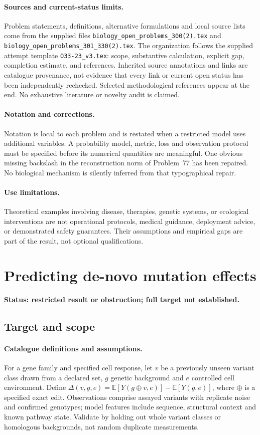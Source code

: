 \documentclass[11pt]{article}
\begin{document}
\paragraph{Sources and current-status limits.}
Problem statements, definitions, alternative formulations and local source lists
come from the supplied files
\texttt{biology\_open\_problems\_300(2).tex} and
\texttt{biology\_open\_problems\_301\_330(2).tex}.
The organization follows the supplied attempt template
\texttt{O33-23\_v3.tex}: scope, substantive calculation, explicit gap,
completion estimate, and references. Inherited source annotations and links are
catalogue provenance, not evidence that every link or current open status has
been independently rechecked. Selected methodological references appear at the
end. No exhaustive literature or novelty audit is claimed.

\paragraph{Notation and corrections.}
Notation is local to each problem and is restated when a restricted model uses
additional variables. A probability model, metric, loss and observation protocol
must be specified before its numerical quantities are meaningful. One obvious
missing backslash in the reconstruction norm of Problem~77 has been repaired.
No biological mechanism is silently inferred from that typographical repair.

\paragraph{Use limitations.}
Theoretical examples involving disease, therapies, genetic systems, or ecological
interventions are not operational protocols, medical guidance, deployment advice,
or demonstrated safety guarantees. Their assumptions and empirical gaps are part
of the result, not optional qualifications.


\section*{Predicting de-novo mutation effects}
\label{prob:029}
\noindent\textbf{Status: restricted result or obstruction; full target not established.}
\subsection{Target and scope}
\paragraph{Catalogue definitions and assumptions.}
For a gene family and specified cell response, let $v$ be a previously unseen variant class drawn from a declared set, $g$ genetic background and $e$ controlled cell environment. Define $\Delta(v,g,e)=\mathbb{E}[Y(g\oplus v,e)]-\mathbb{E}[Y(g,e)]$, where $\oplus$ is a specified exact edit. Observations comprise assayed variants with replicate noise and confirmed genotypes; model features include sequence, structural context and known pathway state. Validate by holding out whole variant classes or homologous backgrounds, not random duplicate measurements.
\end{document}
